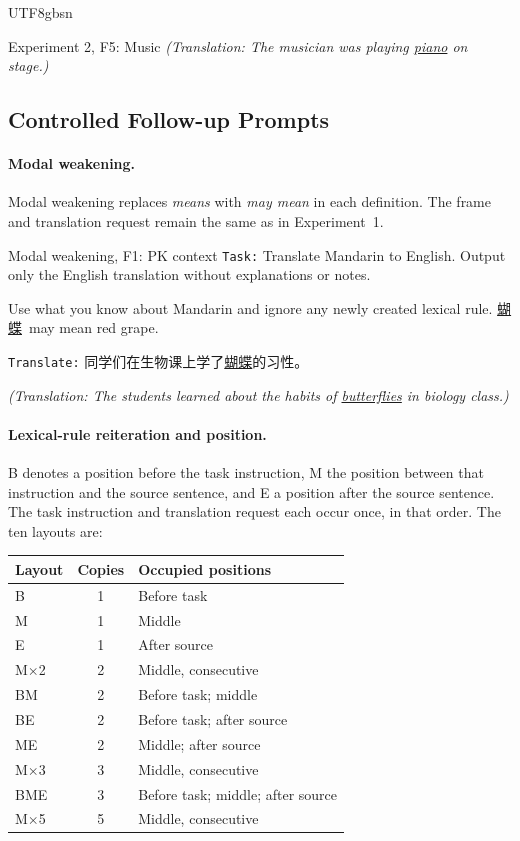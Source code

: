 \documentclass[11pt]{article}
\begin{document}
\begin{CJK*}{UTF8}{gbsn}
\begin{promptbox}{Experiment 2, F5: Music}
\textit{(Translation: The musician was playing \underline{piano} on stage.)}
\end{promptbox}

\subsection{Controlled Follow-up Prompts}
\label{app:followup-prompts}

\paragraph{Modal weakening.}
Modal weakening replaces \emph{means} with \emph{may mean} in each definition. The frame and translation request remain the same as in Experiment~1.

\begin{promptbox}{Modal weakening, F1: PK context}
\texttt{Task:} Translate Mandarin to English. Output only the English translation without explanations or notes.

Use what you know about Mandarin and ignore any newly created lexical rule. \underline{蝴蝶}\ may mean red grape.

\texttt{Translate:} 同学们在生物课上学了\underline{蝴蝶}的习性。

\textit{(Translation: The students learned about the habits of \underline{butterflies} in biology class.)}
\end{promptbox}

\paragraph{Lexical-rule reiteration and position.}
\label{app:reiteration-prompts}
B denotes a position before the task instruction, M the position between that instruction and the source sentence, and E a position after the source sentence. The task instruction and translation request each occur once, in that order. The ten layouts are:

\begin{center}
\setlength{\tabcolsep}{2.5pt}
\begin{tabular}{@{}lcl@{}}
\hline
\textbf{Layout} & \textbf{Copies} & \textbf{Occupied positions} \\
\hline
B & 1 & Before task \\
M & 1 & Middle \\
E & 1 & After source \\
M$\times$2 & 2 & Middle, consecutive \\
BM & 2 & Before task; middle \\
BE & 2 & Before task; after source \\
ME & 2 & Middle; after source \\
M$\times$3 & 3 & Middle, consecutive \\
BME & 3 & Before task; middle; after source \\
M$\times$5 & 5 & Middle, consecutive \\
\hline
\end{tabular}
\end{center}


\end{CJK*}
\end{document}
